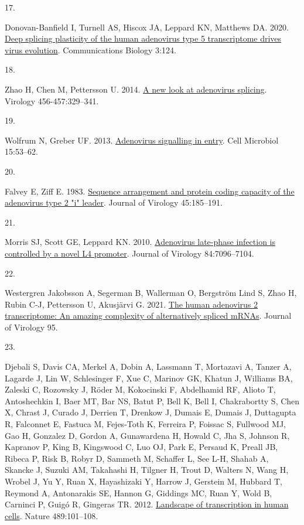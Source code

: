 \documentclass[
]{article}
\newlength{\cslhangindent}
\newlength{\csllabelwidth}
\newenvironment{CSLReferences}[2] %
 {\begin{list}{}{%
  \setlength{\itemindent}{0pt}
  \setlength{\leftmargin}{0pt}
  \setlength{\parsep}{0pt}
  \ifodd #1
   \setlength{\leftmargin}{\cslhangindent}
   \setlength{\itemindent}{-1\cslhangindent}
  \fi
  \setlength{\itemsep}{#2\baselineskip}}}
 {\end{list}}
\newcommand{\CSLLeftMargin}[1]{\parbox[t]{\csllabelwidth}{\strut#1\strut}}
\newcommand{\CSLRightInline}[1]{\parbox[t]{\linewidth - \csllabelwidth}{\strut#1\strut}}
\begin{document}
\begin{CSLReferences}{0}{1}
\CSLLeftMargin{17. }%
\CSLRightInline{Donovan-Banfield I, Turnell AS, Hiscox JA, Leppard KN,
Matthews DA. 2020. \href{https://doi.org/10.1038/s42003-020-0849-9}{Deep
splicing plasticity of the human adenovirus type 5 transcriptome drives
virus evolution}. Communications Biology 3:124.}

\CSLLeftMargin{18. }%
\CSLRightInline{Zhao H, Chen M, Pettersson U. 2014.
\href{https://doi.org/10.1016/j.virol.2014.04.006}{A new look at
adenovirus splicing}. Virology 456-457:329--341.}

\CSLLeftMargin{19. }%
\CSLRightInline{Wolfrum N, Greber UF. 2013.
\href{https://doi.org/10.1111/cmi.12053}{Adenovirus signalling in
entry}. Cell Microbiol 15:53--62.}

\CSLLeftMargin{20. }%
\CSLRightInline{Falvey E, Ziff E. 1983.
\href{https://doi.org/10.1128/jvi.45.1.185-191.1983}{Sequence
arrangement and protein coding capacity of the adenovirus type 2 "i"
leader}. Journal of Virology 45:185--191.}

\CSLLeftMargin{21. }%
\CSLRightInline{Morris SJ, Scott GE, Leppard KN. 2010.
\href{https://doi.org/10.1128/jvi.00107-10}{Adenovirus late-phase
infection is controlled by a novel L4 promoter}. Journal of Virology
84:7096--7104.}

\CSLLeftMargin{22. }%
\CSLRightInline{Westergren Jakobsson A, Segerman B, Wallerman O,
Bergström Lind S, Zhao H, Rubin C-J, Pettersson U, Akusjärvi G. 2021.
\href{https://doi.org/10.1128/jvi.01869-20}{The human adenovirus 2
transcriptome: An amazing complexity of alternatively spliced mRNAs}.
Journal of Virology 95.}

\CSLLeftMargin{23. }%
\CSLRightInline{Djebali S, Davis CA, Merkel A, Dobin A, Lassmann T,
Mortazavi A, Tanzer A, Lagarde J, Lin W, Schlesinger F, Xue C, Marinov
GK, Khatun J, Williams BA, Zaleski C, Rozowsky J, Röder M, Kokocinski F,
Abdelhamid RF, Alioto T, Antoshechkin I, Baer MT, Bar NS, Batut P, Bell
K, Bell I, Chakrabortty S, Chen X, Chrast J, Curado J, Derrien T,
Drenkow J, Dumais E, Dumais J, Duttagupta R, Falconnet E, Fastuca M,
Fejes-Toth K, Ferreira P, Foissac S, Fullwood MJ, Gao H, Gonzalez D,
Gordon A, Gunawardena H, Howald C, Jha S, Johnson R, Kapranov P, King B,
Kingswood C, Luo OJ, Park E, Persaud K, Preall JB, Ribeca P, Risk B,
Robyr D, Sammeth M, Schaffer L, See L-H, Shahab A, Skancke J, Suzuki AM,
Takahashi H, Tilgner H, Trout D, Walters N, Wang H, Wrobel J, Yu Y, Ruan
X, Hayashizaki Y, Harrow J, Gerstein M, Hubbard T, Reymond A,
Antonarakis SE, Hannon G, Giddings MC, Ruan Y, Wold B, Carninci P, Guigó
R, Gingeras TR. 2012.
\href{https://doi.org/10.1038/nature11233}{Landscape of transcription in
human cells}. Nature 489:101--108.}


\end{CSLReferences}
\end{document}

